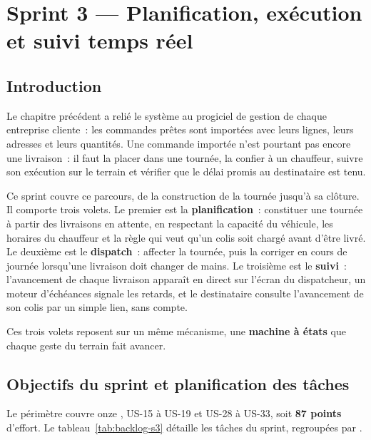 %
\chapter{Sprint 3 — Planification, exécution et suivi temps réel}
\label{ch:tournees}

\section{Introduction}

Le chapitre précédent a relié le système au progiciel de gestion de chaque entreprise cliente~: les
commandes prêtes sont importées avec leurs lignes, leurs adresses et leurs quantités. Une commande
importée n'est pourtant pas encore une livraison~: il faut la placer dans une tournée, la confier à
un chauffeur, suivre son exécution sur le terrain et vérifier que le délai promis au destinataire est
tenu.

Ce sprint couvre ce parcours, de la construction de la tournée jusqu'à sa clôture. Il comporte trois
volets. Le premier est la \textbf{planification}~: constituer une tournée à partir des livraisons en
attente, en respectant la capacité du véhicule, les horaires du chauffeur et la règle qui veut qu'un
colis soit chargé avant d'être livré. Le deuxième est le \textbf{dispatch}~: affecter la tournée,
puis la corriger en cours de journée lorsqu'une livraison doit changer de mains. Le troisième est le
\textbf{suivi}~: l'avancement de chaque livraison apparaît en direct sur l'écran du dispatcheur, un
moteur d'échéances signale les retards, et le destinataire consulte l'avancement de son colis par un
simple lien, sans compte.

Ces trois volets reposent sur un même mécanisme, une \textbf{machine à états} que chaque geste du
terrain fait avancer.

\section{Objectifs du sprint et planification des tâches}

Le périmètre couvre onze , US-15 à US-19 et US-28 à US-33, soit \textbf{87
points} d'effort. Le tableau~\ref{tab:backlog-s3} détaille les tâches du sprint, regroupées par
.

